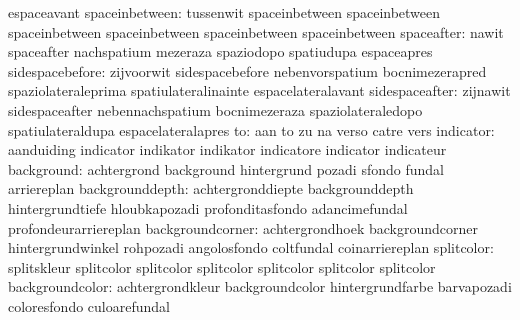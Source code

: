                            espaceavant
           spaceinbetween: tussenwit                 spaceinbetween
                           spaceinbetween            spaceinbetween
                           spaceinbetween            spaceinbetween
                           spaceinbetween
               spaceafter: nawit                     spaceafter
                           nachspatium               mezeraza
                           spaziodopo                spatiudupa
                           espaceapres
          sidespacebefore: zijvoorwit                sidespacebefore
                           nebenvorspatium           bocnimezerapred
                           spaziolateraleprima       spatiulateralinainte
                           espacelateralavant
           sidespaceafter: zijnawit                  sidespaceafter
                           nebennachspatium          bocnimezeraza
                           spaziolateraledopo        spatiulateraldupa
                           espacelateralapres
                       to: aan                       to
                           zu                        na
                           verso                     catre
                           vers
                indicator: aanduiding                indicator
                           indikator                 indikator
                           indicatore                indicator
                           indicateur
               background: achtergrond               background
                           hintergrund               pozadi
                           sfondo                    fundal
                           arriereplan
          backgrounddepth: achtergronddiepte         backgrounddepth
                           hintergrundtiefe          hloubkapozadi
                           profonditasfondo          adancimefundal
                           profondeurarriereplan
         backgroundcorner: achtergrondhoek           backgroundcorner
                           hintergrundwinkel         rohpozadi
                           angolosfondo              coltfundal
                           coinarriereplan
               splitcolor: splitskleur               splitcolor
                           splitcolor                splitcolor
                           splitcolor                splitcolor
                           splitcolor
          backgroundcolor: achtergrondkleur          backgroundcolor
                           hintergrundfarbe          barvapozadi
                           coloresfondo              culoarefundal
